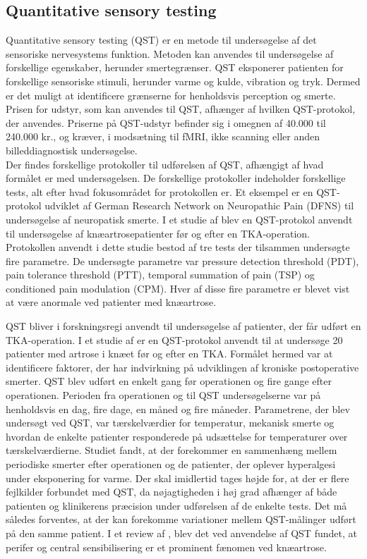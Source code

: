 \subsection{Quantitative sensory testing}
Quantitative sensory testing (QST) er en metode til undersøgelse af det sensoriske nervesystems funktion. Metoden kan anvendes til undersøgelse af forskellige egenskaber, herunder smertegrænser. QST eksponerer patienten for forskellige sensoriske stimuli, herunder varme og kulde, vibration og tryk. Dermed er det muligt at identificere grænserne for henholdsvis perception og smerte. \citep{Yarnitsky2006} Prisen for udstyr, som kan anvendes til QST, afhænger af hvilken QST-protokol, der anvendes. Priserne på QST-udstyr befinder sig i omegnen af 40.000 til 240.000 kr., og kræver, i modsætning til fMRI, ikke scanning eller anden billeddiagnostisk undersøgelse. \\
Der findes forskellige protokoller til udførelsen af QST, afhængigt af hvad formålet er med undersøgelsen. De forskellige protokoller indeholder forskellige tests, alt efter hvad fokusområdet for protokollen er. Et eksempel er en QST-protokol udviklet af German Research Network on Neuropathic Pain (DFNS) til undersøgelse af neuropatisk smerte. \citep{Rolke2006} I et studie af  blev en QST-protokol anvendt til undersøgelse af knæartrosepatienter før og efter en TKA-operation. Protokollen anvendt i dette studie bestod af tre tests der tilsammen undersøgte fire parametre. De undersøgte parametre var pressure detection threshold (PDT), pain tolerance threshold (PTT), temporal summation of pain (TSP) og conditioned pain modulation (CPM). \citep{Petersen2016} Hver af disse fire parametre er blevet vist at være anormale ved patienter med knæartrose. \citep{Suokas2012} \citep{Petersen2016}

QST bliver i forskningsregi anvendt til undersøgelse af patienter, der får udført en TKA-operation. I et studie af  er en QST-protokol anvendt til at undersøge 20 patienter med artrose i knæet før og efter en TKA. Formålet hermed var at identificere faktorer, der har indvirkning på udviklingen af kroniske postoperative smerter. QST blev udført en enkelt gang før operationen og fire gange efter operationen. Perioden fra operationen og til QST undersøgelserne var på henholdsvis en dag, fire dage, en måned og fire måneder. Parametrene, der blev undersøgt ved QST, var tærskelværdier for temperatur, mekanisk smerte og hvordan de enkelte patienter responderede på udsættelse for temperaturer over tærskelværdierne. Studiet fandt, at der forekommer en sammenhæng mellem periodiske smerter efter operationen og de patienter, der oplever hyperalgesi under eksponering for varme. \citep{Martinez2007} Der skal imidlertid tages højde for, at der er flere fejlkilder forbundet med QST, da nøjagtigheden i høj grad afhænger af både patienten og klinikerens præcision under udførelsen af de enkelte tests. Det må således forventes, at der kan forekomme variationer mellem QST-målinger udført på den samme patient. \citep{Yarnitsky2006} I et review af , blev det ved anvendelse af QST fundet, at perifer og central sensibilisering er et prominent fænomen ved knæartrose.

